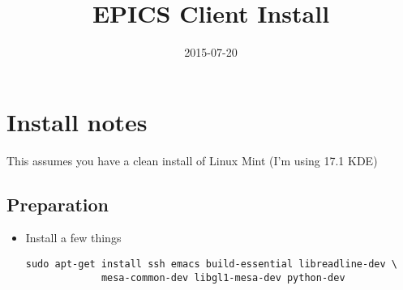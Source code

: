 \documentclass[11pt]{article}
\date{2015-07-20}
\title{EPICS Client Install}
\begin{document}
\maketitle

\section{Install notes}
\label{sec-1}
This assumes you have a clean install of Linux Mint (I'm using 17.1 KDE)

\subsection{Preparation}
\label{sec-1-1}
\begin{itemize}
\item Install a few things
\begin{verbatim}
sudo apt-get install ssh emacs build-essential libreadline-dev \
		     mesa-common-dev libgl1-mesa-dev python-dev
\end{verbatim}
\end{itemize}
\end{document}
